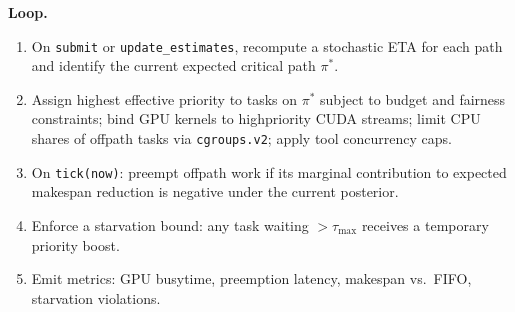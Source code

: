 \documentclass[
]{article}
\begin{document}
\noindent\textbf{Loop.}
\begin{enumerate}
  \item On \texttt{submit} or \texttt{update\_estimates}, recompute a stochastic ETA for each path and identify the current expected critical path $\pi^*$.
  \item Assign highest effective priority to tasks on $\pi^*$ subject to budget and fairness constraints; bind GPU kernels to high\-priority CUDA streams; limit CPU shares of off\-path tasks via \texttt{cgroups.v2}; apply tool concurrency caps.
  \item On \texttt{tick(now)}: preempt off\-path work if its marginal contribution to expected makespan reduction is negative under the current posterior.
  \item Enforce a starvation bound: any task waiting $> \tau_{\max}$ receives a temporary priority boost.
  \item Emit metrics: GPU busy\-time, preemption latency, makespan vs.\ FIFO, starvation violations.
\end{enumerate}
\end{document}
